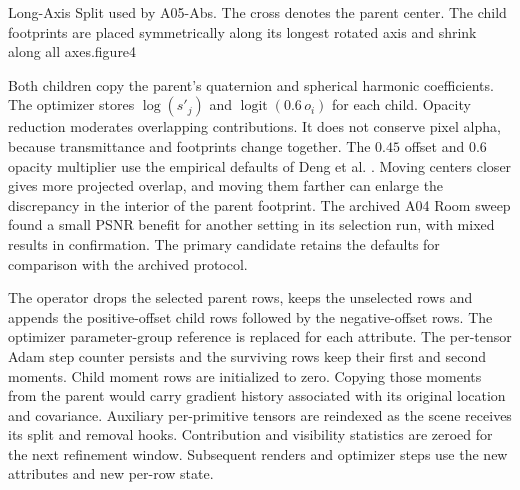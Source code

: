   {Long-Axis Split used by A05-Abs. The cross denotes the parent center. The child footprints are placed symmetrically along its longest rotated axis and shrink along all axes.}{figure4}

Both children copy the parent's quaternion and spherical harmonic coefficients. The optimizer stores $\log(s'_j)$ and $\operatorname{logit}(0.6\,o_i)$ for each child. Opacity reduction moderates overlapping contributions. It does not conserve pixel alpha, because transmittance and footprints change together. The $0.45$ offset and $0.6$ opacity multiplier use the empirical defaults of Deng et al. \cite{ref7}. Moving centers closer gives more projected overlap, and moving them farther can enlarge the discrepancy in the interior of the parent footprint. The archived A04 Room sweep found a small PSNR benefit for another setting in its selection run, with mixed results in confirmation. The primary candidate retains the defaults for comparison with the archived protocol.

The operator drops the selected parent rows, keeps the unselected rows and appends the positive-offset child rows followed by the negative-offset rows. The optimizer parameter-group reference is replaced for each attribute. The per-tensor Adam step counter persists and the surviving rows keep their first and second moments. Child moment rows are initialized to zero. Copying those moments from the parent would carry gradient history associated with its original location and covariance. Auxiliary per-primitive tensors are reindexed as the scene receives its split and removal hooks. Contribution and visibility statistics are zeroed for the next refinement window. Subsequent renders and optimizer steps use the new attributes and new per-row state.


